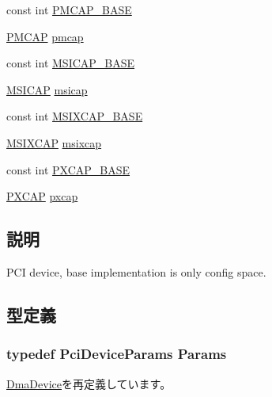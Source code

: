 \begin{Indent}{\bf }\par
{\em \label{_amgrpd41d8cd98f00b204e9800998ecf8427e}
 }\begin{DoxyCompactItemize}
\item 
const int \hyperlink{classPciDevice_ae644f63414585f6d3398caee03da3969}{PMCAP\_\-BASE}
\item 
\hyperlink{structPMCAP}{PMCAP} \hyperlink{classPciDevice_ad40e66fa09f69d8ab4617217b7f1c62e}{pmcap}
\item 
const int \hyperlink{classPciDevice_ac80b4a250e5ead5d34f1808fcfadc1ef}{MSICAP\_\-BASE}
\item 
\hyperlink{structMSICAP}{MSICAP} \hyperlink{classPciDevice_a0a9cdf296cde2e245b0c12d2bb193779}{msicap}
\item 
const int \hyperlink{classPciDevice_a0be1d03890d2b90d9d212a0c069d22f1}{MSIXCAP\_\-BASE}
\item 
\hyperlink{structMSIXCAP}{MSIXCAP} \hyperlink{classPciDevice_aa12134834ad74b26d5592bce8b588842}{msixcap}
\item 
const int \hyperlink{classPciDevice_a7058a632ee6e497e2b436d06064716a0}{PXCAP\_\-BASE}
\item 
\hyperlink{structPXCAP}{PXCAP} \hyperlink{classPciDevice_a88e9ccb85708bfe445318375e8738ec8}{pxcap}
\end{DoxyCompactItemize}
\end{Indent}


\subsection{説明}
PCI device, base implementation is only config space. 

\subsection{型定義}
\hypertarget{classPciDevice_aefbfd3f2d9daf3173b779eeff32e8112}{
\subsubsection[{Params}]{\setlength{\rightskip}{0pt plus 5cm}typedef PciDeviceParams {\bf Params}}}
\label{classPciDevice_aefbfd3f2d9daf3173b779eeff32e8112}


\hyperlink{classDmaDevice_aea7daf6105ab956443385f5f5a9b88c5}{DmaDevice}を再定義しています。

